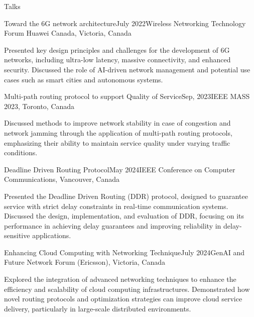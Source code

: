 \documentclass[]{puyang-resume}
\begin{document}

\begin{section}{Talks}

\begin{subsection}{Toward the 6G network architecture}{}{July 2022}{Wireless Networking Technology Forum Huawei Canada, Victoria, Canada}
 \item Presented key design principles and challenges for the development of 6G networks, including ultra-low latency, massive connectivity, and enhanced security. Discussed the role of AI-driven network management and potential use cases such as smart cities and autonomous systems.
 \end{subsection}
 
 \begin{subsection}{Multi-path routing protocol to support Quality of Service}{}{Sep, 2023}{IEEE MASS 2023, Toronto, Canada}
 \item Discussed methods to improve network stability in case of congestion and network jamming through the application of multi-path routing protocols, emphasizing their ability to maintain service quality under varying traffic conditions.
 \end{subsection}

 \begin{subsection}{Deadline Driven Routing Protocol}{}{May 2024}{IEEE Conference on Computer Communications, Vancouver, Canada}
 \item Presented the Deadline Driven Routing (DDR) protocol, designed to guarantee service with strict delay constraints in real-time communication systems. Discussed the design, implementation, and evaluation of DDR, focusing on its performance in achieving delay guarantees and improving reliability in delay-sensitive applications.
 \end{subsection}

 \begin{subsection}{Enhancing Cloud Computing with Networking Technique}{}{July 2024}{GenAI and Future Network Forum (Ericsson), Victoria, Canada}
 \item Explored the integration of advanced networking techniques to enhance the efficiency and scalability of cloud computing infrastructures. Demonstrated how novel routing protocols and optimization strategies can improve cloud service delivery, particularly in large-scale distributed environments.
 \end{subsection}
\end{section}
\end{document}
